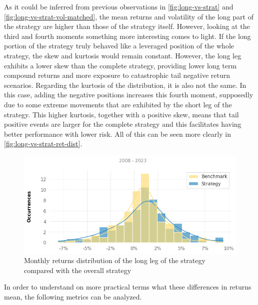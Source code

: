 As it could be inferred from previous observations in \autoref{fig:long-vs-strat} and \autoref{fig:long-vs-strat-vol-matched}, the mean returns and volatility of the long part of the strategy are higher than those of the strategy itself. However, looking at the third and fourth moments something more interesting comes to light. If the long portion of the strategy truly behaved like a leveraged position of the whole strategy, the skew and kurtosis would remain constant. However, the long leg exhibits a lower skew than the complete strategy, providing lower long term compound returns and more exposure to catastrophic tail negative return scenarios. Regarding the kurtosis of the distribution, it is also not the same. In this case, adding the negative positions increases this fourth moment, supposedly due to some extreme movements that are exhibited by the short leg of the strategy. This higher kurtosis, together with a positive skew, means that tail positive events are larger for the complete strategy and this facilitates having better performance with lower risk. All of this can be seen more clearly in \autoref{fig:long-vs-strat-ret-dist}.

\begin{figure}[ht]
    \captionsetup{justification=centering}
    \includegraphics[width=\linewidth]{assets/long-vs-strat-ret-dist.png}
    \caption{Monthly returns distribution of the long leg of the strategy compared with the overall strategy}
    \label{fig:long-vs-strat-ret-dist}
\end{figure}

In order to understand on more practical terms what these differences in returns mean, the following metrics can be analyzed.

